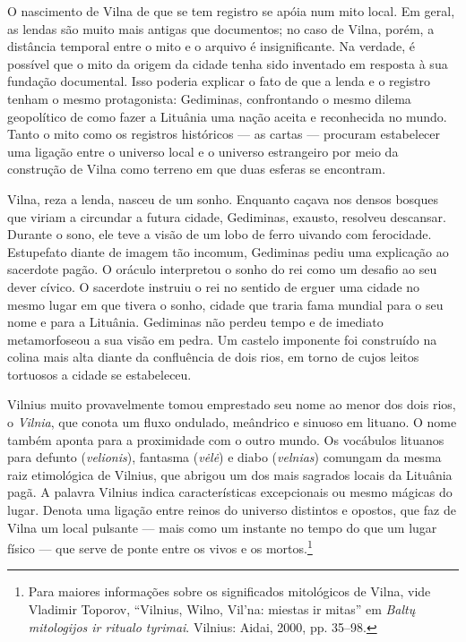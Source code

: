 \asterisc

O nascimento de Vilna de que se tem registro se apóia num mito local. Em
geral, as lendas são muito mais antigas que documentos; no caso de
Vilna, porém, a distância temporal entre o mito e o arquivo é
insignificante. Na verdade, é possível que o mito da origem da cidade
tenha sido inventado em resposta à sua fundação documental. Isso poderia
explicar o fato de que a lenda e o registro tenham o mesmo protagonista:
Gediminas, confrontando o mesmo dilema geopolítico de como fazer a
Lituânia uma nação aceita e reconhecida no mundo. Tanto o mito como os
registros históricos --- as cartas --- procuram estabelecer uma ligação
entre o universo local e o universo estrangeiro por meio da construção
de Vilna como terreno em que duas esferas se encontram.

Vilna, reza a lenda, nasceu de um sonho. Enquanto caçava nos densos
bosques que viriam a circundar a futura cidade, Gediminas, exausto,
resolveu descansar. Durante o sono, ele teve a visão de um lobo de ferro
uivando com ferocidade. Estupefato diante de imagem tão incomum,
Gediminas pediu uma explicação ao sacerdote pagão. O oráculo interpretou
o sonho do rei como um desafio ao seu dever cívico. O sacerdote instruiu
o rei no sentido de erguer uma cidade no mesmo lugar em que tivera o
sonho, cidade que traria fama mundial para o seu nome e para a Lituânia.
Gediminas não perdeu tempo e de imediato metamorfoseou a sua visão em
pedra. Um castelo imponente foi construído na colina mais alta diante da
confluência de dois rios, em torno de cujos leitos tortuosos a cidade se
estabeleceu.

Vilnius muito provavelmente tomou emprestado seu nome ao menor dos dois
rios, o \emph{Vilnia}, que conota um fluxo ondulado, meândrico e sinuoso
em lituano. O nome também aponta para a proximidade com o outro mundo.
Os vocábulos lituanos para defunto (\emph{velionis}), fantasma
(\emph{vėlė}) e diabo (\emph{velnias}) comungam da mesma raiz
etimológica de Vilnius, que abrigou um dos mais sagrados locais da
Lituânia pagã. A palavra Vilnius indica características excepcionais ou
mesmo mágicas do lugar. Denota uma ligação entre reinos do universo
distintos e opostos, que faz de Vilna um local pulsante --- mais como um
instante no tempo do que um lugar físico --- que serve de ponte entre os
vivos e os mortos.\footnote{Para maiores informações sobre os
  significados mitológicos de Vilna, vide Vladimir Toporov, ``Vilnius,
  Wilno, Vil'na: miestas ir mitas'' em \emph{Baltų mitologijos ir
  ritualo tyrimai}. Vilnius: Aidai, 2000, pp. 35--98.}

